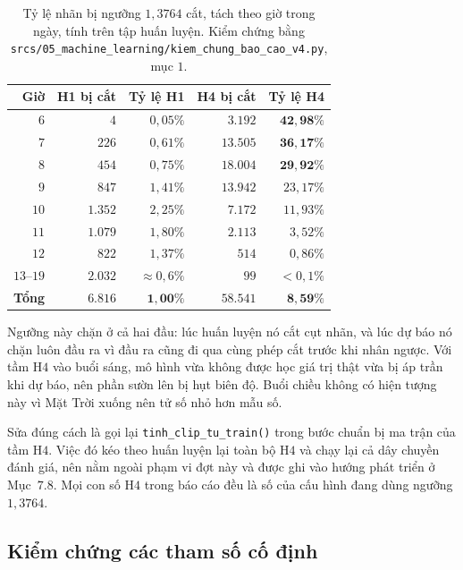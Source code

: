 \documentclass[12pt, a4paper]{report}
\begin{document}
\begin{table}[htbp]
\centering
\caption{Tỷ lệ nhãn bị ngưỡng $1{,}3764$ cắt, tách theo giờ trong ngày, tính trên tập huấn
luyện. Kiểm chứng bằng \texttt{srcs/05\_machine\_learning/kiem\_chung\_bao\_cao\_v4.py}, mục $1$.}
\label{tab:cat_theo_gio}
\small
\begin{tabular}{r r r r r}
\toprule
\textbf{Giờ} & \textbf{H1 bị cắt} & \textbf{Tỷ lệ H1} & \textbf{H4 bị cắt} & \textbf{Tỷ lệ H4} \\
\midrule
$6$  & $4$     & $0{,}05\%$ & $3.192$  & $\mathbf{42{,}98\%}$ \\
$7$  & $226$   & $0{,}61\%$ & $13.505$ & $\mathbf{36{,}17\%}$ \\
$8$  & $454$   & $0{,}75\%$ & $18.004$ & $\mathbf{29{,}92\%}$ \\
$9$  & $847$   & $1{,}41\%$ & $13.942$ & $23{,}17\%$ \\
$10$ & $1.352$ & $2{,}25\%$ & $7.172$  & $11{,}93\%$ \\
$11$ & $1.079$ & $1{,}80\%$ & $2.113$  & $3{,}52\%$ \\
$12$ & $822$   & $1{,}37\%$ & $514$    & $0{,}86\%$ \\
$13$--$19$ & $2.032$ & $\approx 0{,}6\%$ & $99$ & $< 0{,}1\%$ \\
\midrule
\textbf{Tổng} & $\mathbf{6.816}$ & $\mathbf{1{,}00\%}$ & $\mathbf{58.541}$ & $\mathbf{8{,}59\%}$ \\
\bottomrule
\end{tabular}
\end{table}

Ngưỡng này chặn ở cả hai đầu: lúc huấn luyện nó cắt cụt nhãn, và lúc dự báo nó chặn luôn đầu
ra vì đầu ra cũng đi qua cùng phép cắt trước khi nhân ngược. Với tầm H$4$ vào buổi sáng, mô
hình vừa không được học giá trị thật vừa bị áp trần khi dự báo, nên phần sườn lên bị hụt biên
độ. Buổi chiều không có hiện tượng này vì Mặt Trời xuống nên tử số nhỏ hơn mẫu số.

Sửa đúng cách là gọi lại \texttt{tinh\_clip\_tu\_train()} trong bước chuẩn bị ma trận của tầm H$4$.
Việc đó kéo theo huấn luyện lại toàn bộ H$4$ và chạy lại cả dây chuyền đánh giá, nên nằm ngoài
phạm vi đợt này và được ghi vào hướng phát triển ở Mục~$7.8$. Mọi con số H$4$ trong báo cáo đều
là số của cấu hình đang dùng ngưỡng $1{,}3764$.

\FloatBarrier
\subsection{Kiểm chứng các tham số cố định}
\end{document}
